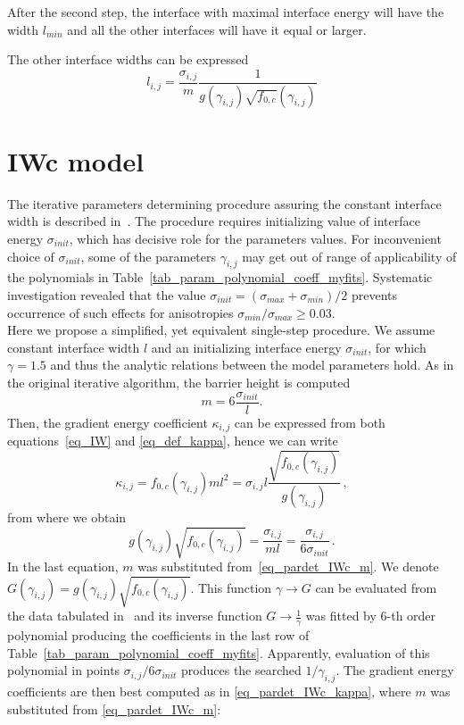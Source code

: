 After the second step, the interface with maximal interface energy will have the width $l_{min}$ and all the other interfaces will have it equal or larger.

The other interface widths can be expressed
\begin{equation}
	l_{i,j} = \frac{\sigma_{i,j}}{m}\frac{1}{g(\gamma_{i,j})\sqrt{f_{0,c}}(\gamma_{i,j})}
\end{equation}

\section*{IWc model}
The iterative parameters determining procedure assuring the constant interface width is described in~\cite{Moelans2008}. The procedure requires initializing value of interface energy $\sigma_{init}$, which has decisive role for the parameters values. For inconvenient choice of $\sigma_{init}$, some of the parameters $\gamma_{i,j}$ may get out of range of applicability of the polynomials in Table~\ref{tab_param_polynomial_coeff_myfits}. Systematic investigation revealed that the value $\sigma_{init}=(\sigma_{max}+\sigma_{min})/2$ prevents occurrence of such effects for anisotropies $\sigma_{min}/\sigma_{max}\geq 0.03$. \\
Here we propose a simplified, yet equivalent single-step procedure. We assume constant interface width $l$ and an initializing interface energy $\sigma_{init}$, for which $\gamma=1.5$ and thus the analytic relations between the model parameters hold. As in the original iterative algorithm, the barrier height is computed
\begin{equation} \label{eq_pardet_IWc_m}
	m = 6\frac{\sigma_{init}}{l} .
\end{equation}
Then, the gradient energy coefficient $\kappa_{i,j}$ can be expressed from both equations~\eqref{eq_IW} and \eqref{eq_def_kappa}, hence we can write
\begin{equation} \label{eq_pardet_IWc_kappa}
	\kappa_{i,j}=f_{0,c}(\gamma_{i,j})ml^2 = \sigma_{i,j}l\frac{\sqrt{f_{0,c}(\gamma_{i,j})}}{g(\gamma_{i,j})} \,,
\end{equation}
from where we obtain
\begin{equation}
	g(\gamma_{i,j})\sqrt{f_{0,c}(\gamma_{i,j})}=\frac{\sigma_{i,j}}{ml} = \frac{\sigma_{i,j}}{6\sigma_{init}} \,.
\end{equation}
In the last equation, $m$ was substituted from~\eqref{eq_pardet_IWc_m}. We denote $G(\gamma_{i,j})=g(\gamma_{i,j})\sqrt{f_{0,c}(\gamma_{i,j})}$. This function $\gamma\rightarrow G$ can be evaluated from the data tabulated in~\cite{Ravash2017} and its inverse function $G \rightarrow \frac{1}{\gamma}$ was fitted by 6-th order polynomial producing the coefficients in the last row of Table~\ref{tab_param_polynomial_coeff_myfits}. Apparently, evaluation of this polynomial in points $\sigma_{i,j}/6\sigma_{init}$ produces the searched $1/\gamma_{i,j}$. The gradient energy coefficients are then best computed as in \ref{eq_pardet_IWc_kappa}, where $m$ was substituted from \ref{eq_pardet_IWc_m}:
